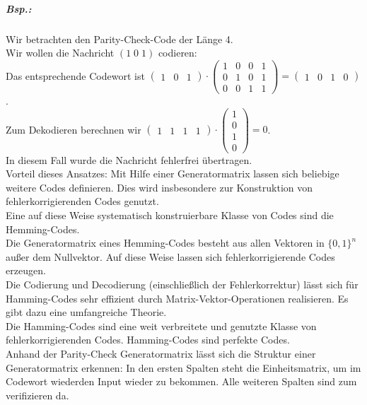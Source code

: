 \subparagraph{Bsp.:} Wir betrachten den Parity-Check-Code der Länge 4. \\
Wir wollen die Nachricht $(1\;0\;1)$ codieren:\\
Das entsprechende Codewort ist $\begin{pmatrix}
1 & 0 & 1
\end{pmatrix}\cdot \begin{pmatrix}
1 & 0 & 0 & 1\\
0 & 1 & 0 & 1 \\
0 & 0 & 1 & 1
\end{pmatrix}= \begin{pmatrix}
1 & 0 & 1 & 0
\end{pmatrix}$. \\
Zum Dekodieren berechnen wir $\begin{pmatrix}
1 & 1 & 1 & 1
\end{pmatrix}\cdot \begin{pmatrix}
1\\
0\\
1\\
0
\end{pmatrix}= 0$.\\
In diesem Fall wurde die Nachricht fehlerfrei übertragen.\bigskip\\
Vorteil dieses Ansatzes: Mit Hilfe einer Generatormatrix lassen sich beliebige weitere Codes definieren. Dies wird insbesondere zur Konstruktion von fehlerkorrigierenden Codes genutzt.\medskip\\
Eine auf diese Weise systematisch konstruierbare Klasse von Codes sind die Hemming-Codes.\\
Die Generatormatrix eines Hemming-Codes besteht aus allen Vektoren in $\{0,1\}^n$ außer dem Nullvektor. Auf diese Weise lassen sich fehlerkorrigierende Codes erzeugen.\\
Die Codierung und Decodierung (einschließlich der Fehlerkorrektur) lässt sich für Hamming-Codes sehr effizient durch Matrix-Vektor-Operationen realisieren. Es gibt dazu eine umfangreiche Theorie.\\
Die Hamming-Codes sind eine weit verbreitete und genutzte Klasse von fehlerkorrigierenden Codes. Hamming-Codes sind perfekte Codes.
\bigskip\\
Anhand der Parity-Check Generatormatrix lässt sich die Struktur einer Generatormatrix erkennen: In den ersten Spalten steht die Einheitsmatrix, um im Codewort wiederden Input wieder zu bekommen. Alle weiteren Spalten sind zum verifizieren da. \\
